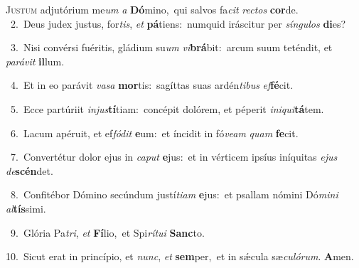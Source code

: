 \lettrine{\initial\textcolor{\initialcolor}{J}}{ustum} adjutórium me\textit{um} \textit{a} \textbf{Dó}\-mino,~\star qui salvos fa\textit{cit} \textit{rec}\-\textit{tos} \textbf{cor}\-de.\\
{\numbfont\textcolor{\numbcolor}{~2.}}~Deus judex justus, for\-\textit{tis}\-, \textit{et} \textbf{pá}\-tiens:~\star numquid iráscitur per \textit{sín}\-\textit{gu}\textit{los} \textbf{di}\-es?\par
{\numbfont\textcolor{\numbcolor}{~3.}}~Nisi convérsi fuéritis, gládium su\textit{um} \textit{vi}\-\textbf{brá}bit:~\star arcum suum teténdit, et \textit{pa}\-\textit{rá}\textit{vit} \textbf{il}\-lum.\par
{\numbfont\textcolor{\numbcolor}{~4.}}~Et in eo parávit \textit{va}\-\textit{sa} \textbf{mor}\-tis:~\star sagíttas suas ardén\-\textit{ti}\-\textit{bus} \textit{ef}\-\textbf{fé}cit.\par
{\numbfont\textcolor{\numbcolor}{~5.}}~Ecce partúriit \textit{in}\-\textit{jus}\textbf{tí}tiam:~\star concépit dolórem, et péperit \textit{in}\-\textit{i}\textit{qui}\textbf{tá}tem.\par
{\numbfont\textcolor{\numbcolor}{~6.}}~Lacum apéruit, et ef\-\textit{fó}\-\textit{dit} \textbf{e}\-um:~\star et íncidit in fó\-\textit{ve}\-\textit{am} \textit{quam} \textbf{fe}\-cit.\par
{\numbfont\textcolor{\numbcolor}{~7.}}~Convertétur dolor ejus in \textit{ca}\-\textit{put} \textbf{e}\-jus:~\star et in vérticem ipsíus iníquitas \textit{e}\-\textit{jus} \textit{de}\-\textbf{scén}det.\par
{\numbfont\textcolor{\numbcolor}{~8.}}~Confitébor Dómino secúndum justí\-\textit{ti}\-\textit{am} \textbf{e}\-jus:~\star et psallam nómini Dó\-\textit{mi}\-\textit{ni} \textit{al}\-\textbf{tís}simi.\par
{\numbfont\textcolor{\numbcolor}{~9.}}~Glória Pa\-\textit{tri}\-, \textit{et} \textbf{Fí}\-lio,~\star et Spi\-\textit{rí}\-\textit{tu}\textit{i} \textbf{Sanc}\-to.\par
{\numbfont\textcolor{\numbcolor}{10.}}~Sicut erat in princípio, et \textit{nunc}\-, \textit{et} \textbf{sem}\-per,~\star et in sǽcula sæ\-\textit{cu}\-\textit{ló}\textit{rum}. \textbf{A}\-men.\par
